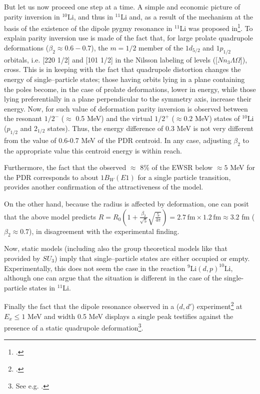 \begin{subappendices}
But let us now proceed one step at a time. A  simple and economic picture of parity inversion in $^{10}$Li, and thus in $^{11}$Li and, as a result of the mechanism at the basis of  the existence of the  dipole pygmy resonance in $^{11}$Li was proposed in\footnote{\cite{Hamamoto:07}.}. To explain parity inversion use is made of the fact that, for large prolate quadrupole deformations ($\beta_2\approx0.6-0.7$), the $m=1/2$ member of the $1d_{5/2}$ and $1p_{1/2}$ orbitals, i.e. [220 1/2] and [101 1/2] in the Nilsson labeling of levels ([$Nn_3\Lambda\Omega$]), cross. This is in keeping with the fact that quadrupole distortion changes the energy of single--particle states; those having orbits lying in a plane containing the poles become, in the case of prolate deformations, lower in energy, while those lying preferentially in a plane perpendicular to the symmetry axis, increase their energy. Now, for such value of deformation parity inversion is  observed between the resonant $1/2^-$ ($\approx$ 0.5 MeV) and the virtual $1/2^+$ ($\approx 0.2$ MeV) states of $^{10}$Li ($p_{1/2}$ and $2_{1/2}$ states). Thus, the energy difference of 0.3 MeV is not very different from the value of 0.6-0.7 MeV of the PDR centroid. In any case, adjusting $\beta_2$ to the appropriate value this centroid energy is within reach. 


Furthermore, the fact  that the observed $\approx$ 8\% of the EWSR below $\approx 5$ MeV for the PDR corresponds to about $1B_{W}(E1)$ for a single particle transition, provides another confirmation of the attractiveness of the model. 

On the other hand, because the radius is  affected by deformation, one can posit that the above model predicts  $R=R_0(1+\frac{\beta_2}{\sqrt{5}}\sqrt{\frac{5}{4\pi}})=2.7\,\text{fm}\times 1.2\,\text{fm}\approx 3.2$ fm ($\beta_2\approx0.7$), in disagreement  with the experimental finding. 


Now, static models (including also the group theoretical models like that provided by $SU_3$) imply that single--particle states are either occupied or empty. Experimentally, this does not seem the case in the reaction $^9$Li$(d,p)^{10}$Li, although one can argue that the situation is different in the case of the single-particle states in $^{11}$Li.

Finally the fact that the dipole resonance observed in a ($d,d'$) experiment\footnote{\cite{Kanungo:15}.} at $E_x\leq1$ MeV and width 0.5 MeV displays a single peak testifies against the presence of a static quadrupole deformation\footnote{See e.g. \cite{Bohr:75}.}.



\end{subappendices}
